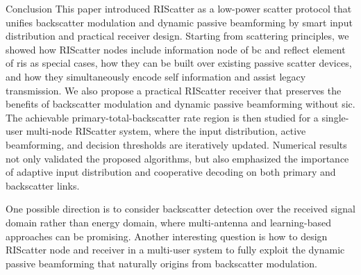 \documentclass[journal,12pt,onecolumn,draftclsnofoot]{IEEEtran}
\theoremstyle{remark}
\begin{document}
\begin{section}{Conclusion}
	This paper introduced RIScatter as a low-power scatter protocol that unifies backscatter modulation and dynamic passive beamforming by smart input distribution and practical receiver design.
	Starting from scattering principles, we showed how RIScatter nodes include information node of \gls{bc} and reflect element of \gls{ris} as special cases, how they can be built over existing passive scatter devices, and how they simultaneously encode self information and assist legacy transmission.
	We also propose a practical RIScatter receiver that preserves the benefits of backscatter modulation and dynamic passive beamforming without \gls{sic}.
	The achievable primary-total-backscatter rate region is then studied for a single-user multi-node RIScatter system, where the input distribution, active beamforming, and decision thresholds are iteratively updated.
	Numerical results not only validated the proposed algorithms, but also emphasized the importance of adaptive input distribution and cooperative decoding on both primary and backscatter links.

	One possible direction is to consider backscatter detection over the received signal domain rather than energy domain, where multi-antenna and learning-based approaches can be promising.
	Another interesting question is how to design RIScatter node and receiver in a multi-user system to fully exploit the dynamic passive beamforming that naturally origins from backscatter modulation.
\end{section}
\end{document}

